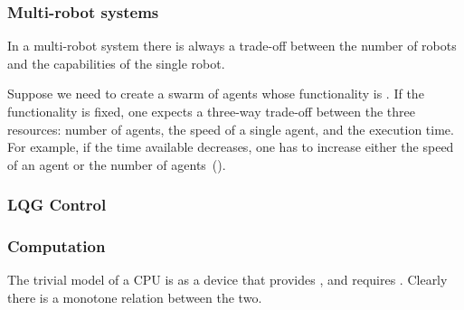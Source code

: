 \begin{figure}[h]
\begin{center}
\end{center}
\caption{ \label{fig:networklink}}
\end{figure}


\subsubsection{Multi-robot systems}

In a multi-robot system there is always a trade-off between the number
of robots and the capabilities of the single robot.
\begin{example}
Suppose we need to create a swarm of agents whose functionality is
. If the functionality is fixed, one expects
a three-way trade-off between the three resources: number of agents,
the speed of a single agent, and the execution time. For example,
if the time available decreases, one has to increase either the speed
of an agent or the number of agents~().
\end{example}

\begin{figure}[h]
\caption{}
\end{figure}
 

\subsubsection{LQG Control}




\subsubsection{Computation}
 

The trivial model of a CPU is as a device that provides , and requires . Clearly there
is a monotone relation between the two.

\begin{figure}[h]
    \begin{center}
    \end{center}
    \caption{}
    \end{figure}
    
